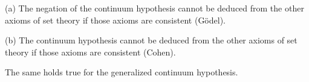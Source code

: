 (a) The negation of the continuum hypothesis cannot be deduced from the other axioms of set theory if those axioms are consistent (G\"odel).

(b) The continuum hypothesis cannot be deduced from the other axioms of set theory if those axioms are consistent (Cohen).

The same holds true for the generalized continuum hypothesis.
